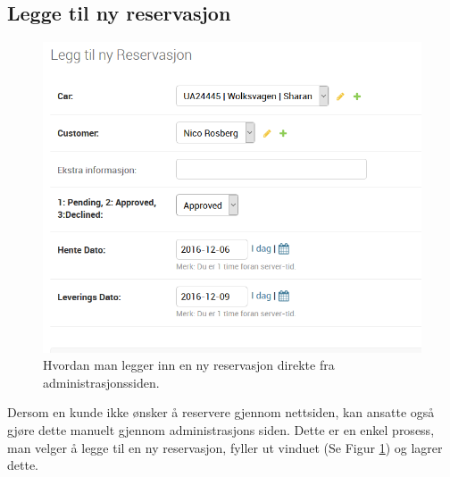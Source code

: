 \subsection*{Legge til ny reservasjon}




\begin{figure}[h!]
\begin{flushright}
\begin{minipage}{0.5\textwidth}
\begin{center}
    \includegraphics[width=1\textwidth]{Bilder/admin_ny_reservasjon.png}
    \caption[Ny reservasjon fra administrasjonsside]{Hvordan man legger inn en ny reservasjon direkte fra administrasjonssiden.}
    \label{fig:admin_new_res}
\end{center}
\end{minipage}
\end{flushright}
\end{figure}


%
\vspace{-7cm}
%
\begin{flushleft}
\begin{minipage}{0.4\textwidth}

%
%
Dersom en kunde ikke ønsker å reservere gjennom nettsiden, kan ansatte også gjøre dette manuelt gjennom administrasjons siden. Dette er en enkel prosess, man velger å legge til en ny reservasjon, fyller ut vinduet (Se Figur \ref{fig:admin_new_res}) og lagrer dette.

\end{minipage}
\end{flushleft}

